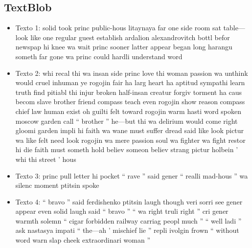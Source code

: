 \documentclass[a4paper,twocolumn]{article}
\begin{document}
    \subsection{TextBlob}\label{subsec:textblob_out}
    \begin{itemize}
        \item Texto 1: solid took princ public-hous litaynaya far one side room sat table—look like one regular guest establish ardalion alexandrovitch bottl befor newspap hi knee wa wait princ sooner latter appear began long harangu someth far gone wa princ could hardli understand word
        \item Texto 2: whi recal thi wa insan side princ love thi woman passion wa unthink would cruel inhuman ye rogojin fair ha larg heart ha aptitud sympathi learn truth find pitiabl thi injur broken half-insan creatur forgiv torment ha caus becom slave brother friend compass teach even rogojin show reason compass chief law human exist oh guilti felt toward rogojin warm hasti word spoken moscow garden call “ brother ” he—but thi wa delirium would come right gloomi garden impli hi faith wa wane must suffer dread said like look pictur wa like felt need look rogojin wa mere passion soul wa fighter wa fight restor hi die faith must someth hold believ someon believ strang pictur holbein ’ whi thi street ’ hous
        \item Texto 3: princ pull letter hi pocket “ rave ” said gener “ realli mad-hous ” wa silenc moment ptitsin spoke
        \item Texto 4: “ bravo ” said ferdishenko ptitsin laugh though veri sorri see gener appear even solid laugh said “ bravo ” “ wa right truli right ” cri gener warmth solemn “ cigar forbidden railway carriag peopl much ” “ well ladi ” ask nastasya impati “ the—ah ’ mischief lie ” repli ivolgin frown “ without word warn slap cheek extraordinari woman ”

    \end{itemize}
\end{document}
